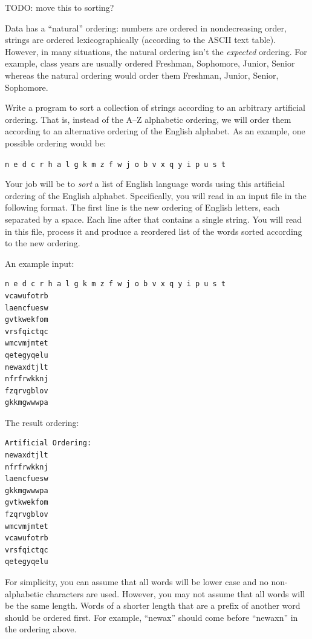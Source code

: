 \begin{exer}

TODO: move this to sorting?

Data has a ``natural'' ordering: numbers are ordered in nondecreasing 
order, strings are ordered lexicographically (according to the ASCII text 
table).  However, in many situations, the natural ordering isn't the 
\emph{expected} ordering.  For example, class years are usually ordered Freshman, Sophomore, Junior, Senior whereas the natural ordering 
would order them Freshman, Junior, Senior, Sophomore.  

Write a program to sort a collection of strings according to 
an arbitrary artificial ordering.  That is, instead of the A--Z 
alphabetic ordering, we will order them according to an alternative 
ordering of the English alphabet.  As an example, one possible
ordering would be:

\texttt{n e d c r h a l g k m z f w j o b v x q y i p u s t}

Your job will be to \emph{sort} a list of English language words 
using this artificial ordering of the English alphabet.  Specifically, 
you will read in an input file in the following format.  The first line 
is the new ordering of English letters, each separated by a space.  
Each line after that contains a single string.  
You will read in this file, process it and produce a reordered list 
of the words sorted according to the new ordering.  

An example input:

\begin{verbatim}
n e d c r h a l g k m z f w j o b v x q y i p u s t
vcawufotrb
laencfuesw
gvtkwekfom
vrsfqictqc
wmcvmjmtet
qetegyqelu
newaxdtjlt
nfrfrwkknj
fzqrvgblov
gkkmgwwwpa
\end{verbatim}

The result ordering: 

\begin{verbatim}
Artificial Ordering: 
newaxdtjlt
nfrfrwkknj
laencfuesw
gkkmgwwwpa
gvtkwekfom
fzqrvgblov
wmcvmjmtet
vcawufotrb
vrsfqictqc
qetegyqelu
\end{verbatim}

For simplicity, you can assume that all words will be lower 
case and no non-alphabetic characters are used.  However, 
you may not assume that all words will be the same length. 
Words of a shorter length that are a prefix of another word 
should be ordered first.  For example, ``newax'' should come 
before ``newaxn'' in the ordering above.
\end{exer}

